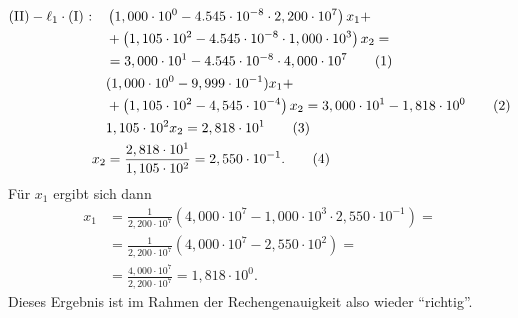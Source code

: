 \documentclass[english, parskip=full]{scrartcl}
\newcommand\numberthis{\addtocounter{equation}{1}\tag{\theequation}}
\newcommand{\kla}{}
\newcommand{\tecxt}{}
\begin{document}
\begin{align*}
\tecxt\text{(II)} - \ell_1\cdot \tecxt\text{(I)   :} \ \ \  &\kla\left( 1,000\cdot 10^{0} - 4.545\cdot 10^{-8} \cdot 2,200\cdot 10^{7} \right)x_1 + \\
& + \kla\left( 1,105\cdot 10^2 - 4.545\cdot 10^{-8} \cdot 1,000\cdot 10^3 \right)x_2 = \\
&= 3,000\cdot 10^1 - 4.545\cdot 10^{-8}\cdot 4,000\cdot 10^7 \numberthis\\
& (1,000\cdot 10^{0} - 9,999\cdot 10^{-1})x_1 + \\
& + \kla\left( 1,105\cdot 10^2 - 4,545\cdot 10^{-4} \right)x_2 = 3,000\cdot 10^1 - 1,818\cdot 10^{0} \numberthis\\
& 1,105\cdot 10^2 x_2 = 2,818\cdot 10^1  \numberthis\\
x_2 &= \frac{2,818\cdot 10^1}{1,105\cdot 10^2} = 2,550\cdot 10^{-1}. \numberthis
\end{align*}
Für $x_1$ ergibt sich dann
\begin{align}
x_1 &= \frac{1}{2,200\cdot 10^{7}}\kla\left( 4,000\cdot 10^7 - 1,000\cdot 10^3 \cdot 2,550\cdot 10^{-1} \right) = \\
&= \frac{1}{2,200\cdot 10^{7}}\kla\left( 4,000\cdot 10^7 - 2,550\cdot 10^{2} \right) = \\
&=\frac{4,000\cdot 10^7}{2,200\cdot 10^{7}} = 1,818\cdot 10^{0}.
\end{align}
Dieses Ergebnis ist im Rahmen der Rechengenauigkeit also wieder ``richtig''.
\end{document}
